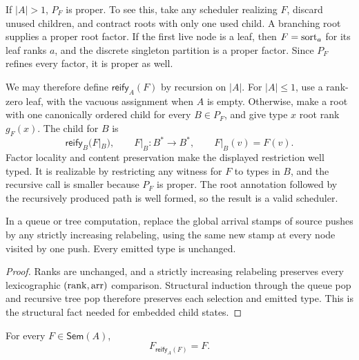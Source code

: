 If \(|A|>1\), \(P_F\) is proper.  To see this, take any scheduler realizing
\(F\), discard unused children, and contract roots with only one used child.
A branching root supplies a proper root factor.  If the first live node is a
leaf, then \(F=\operatorname{sort}_a\) for its leaf ranks \(a\), and the discrete singleton
partition is a proper factor.  Since \(P_F\) refines every factor, it is proper
as well.

We may therefore define \(\mathsf{reify}_A(F)\) by recursion on \(|A|\).
For \(|A|\le1\), use a rank-zero leaf, with the vacuous assignment when \(A\)
is empty.  Otherwise, make a root with one canonically ordered child for every
\(B\in P_F\), and give type \(x\) root rank \(g_F(x)\).  The child for \(B\)
is
\[
  \mathsf{reify}_B(F|_B),
  \qquad
  F|_B:B^*\to B^*,
  \qquad
  F|_B(v)=F(v).
\]
Factor locality and content preservation make the displayed restriction
well typed.  It is realizable by restricting any witness for \(F\) to types
in \(B\), and the recursive call is smaller because \(P_F\) is proper.  The
root annotation followed by the recursively produced path is well formed, so
the result is a valid scheduler.

\begin{lemma}
\label{lem:nbe-arrival-renaming}
In a queue or tree computation, replace the global arrival stamps of source
pushes by any strictly increasing relabeling, using the same new stamp at every
node visited by one push.  Every emitted type is unchanged.
\end{lemma}

\begin{proof}
Ranks are unchanged, and a strictly increasing relabeling preserves every
lexicographic \((\operatorname{rank},\operatorname{arr})\) comparison.  Structural induction through the
queue pop and recursive tree pop therefore preserves each selection and
emitted type.  This is the structural fact needed for embedded child states.
\end{proof}

\begin{theorem}
\label{thm:nbe-adequacy}
For every \(F\in\mathsf{Sem}(A)\),
\begin{equation}
  F_{\mathsf{reify}_A(F)}=F.
  \label{eq:nbe-adequacy}
\end{equation}
\end{theorem}

